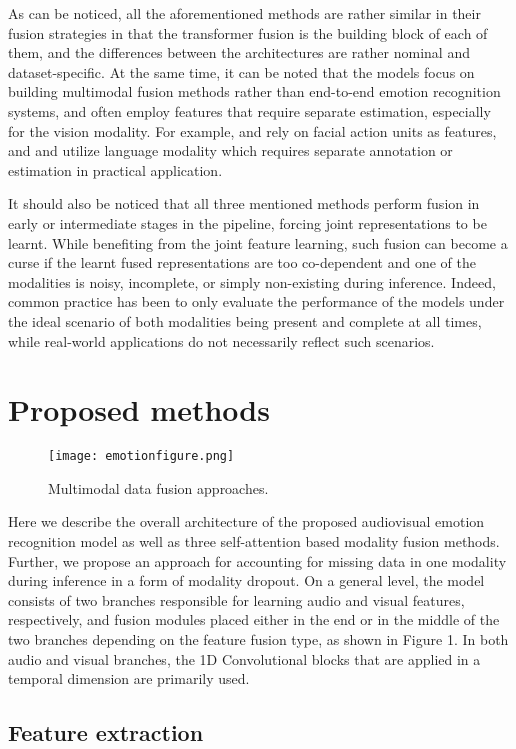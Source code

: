 \documentclass[a4paper,conference]{IEEEtran}
\begin{document}
As can be noticed, all the aforementioned methods are rather similar in their fusion strategies in that the transformer fusion is the building block of each of them, and the differences between the architectures are rather nominal and dataset-specific. At the same time, it can be noted that the models focus on building multimodal fusion methods rather than end-to-end emotion recognition systems, and often employ features that require separate estimation, especially for the vision modality. For example, \cite{mult} and \cite{icasspav} rely on facial action units as features, and \cite{mult} and \cite{interspeech} utilize language modality which requires separate annotation or estimation in practical application.

It should also be noticed that all three mentioned methods perform fusion in early or intermediate stages in the pipeline, forcing joint representations to be learnt. While benefiting from the joint feature learning, such fusion can become a curse if the learnt fused representations are too co-dependent and one of the modalities is noisy, incomplete, or simply non-existing during inference. Indeed, common practice has been to only evaluate the performance of the models under the ideal scenario of both modalities being present and complete at all times, while real-world applications do not necessarily reflect such scenarios.

\section{Proposed methods}
\begin{figure*}[h]
\texttt{[image: emotionfigure.png]}
\caption{Multimodal data fusion approaches.}
\end{figure*}

Here we describe the overall architecture of the proposed audiovisual emotion recognition model as well as three self-attention based modality fusion methods. Further, we propose an approach for accounting for missing data in one modality during inference in a form of modality dropout. On a general level, the model consists of two branches responsible for learning audio and visual features, respectively, and fusion modules placed either in the end or in the middle of the two branches depending on the feature fusion type, as shown in Figure 1. In both audio and visual branches, the 1D Convolutional blocks that are applied in a temporal dimension are primarily used.

\subsection{Feature extraction}
\end{document}
